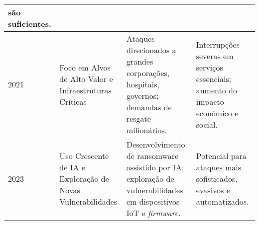 \begin{table}[htbp]
\begin{tabularx}{\textwidth}{|l|p{3cm}|p{5cm}|p{5cm}|}
        são suficientes. \cite{CyberMaxxRansomwareHistory, Robb2024RansomwareHistory, ThreatDownALPHVBlackCat, AkamaiBlackCatRansomware} \\ \hline
        2021 & Foco em Alvos de Alto Valor e Infraestruturas Críticas & Ataques direcionados a grandes 
        corporações, hospitais, governos; demandas de resgate milionárias. & Interrupções severas em serviços essenciais; 
        aumento do impacto econômico e social. \cite{CyberMaxxRansomwareHistory, Robb2024RansomwareHistory} \\ \hline
        2023 & Uso Crescente de IA e Exploração de Novas Vulnerabilidades & Desenvolvimento de ransomware assistido 
        por IA; exploração de vulnerabilidades em dispositivos IoT e \textit{firmware}. & Potencial para ataques mais sofisticados, 
        evasivos e automatizados. \cite{ENISA_ETL_2023, KasperskyRansomwareReport2025} \\ \hline
    \end{tabularx}
\end{table}